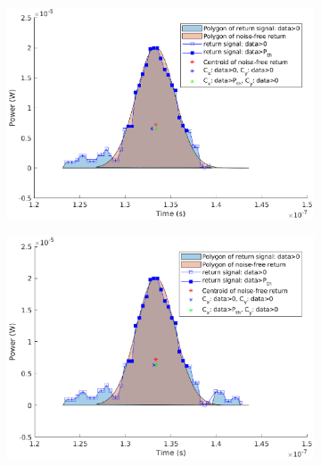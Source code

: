 \begin{figure}[t!p] %
\graphicspath{ {figures/} }
\centering
    \begin{subfigure}{.7\textwidth}
    \centering
    \includegraphics[width=.8\textwidth]{figures/chapter6_ADC/centroid_edge1_d_20_snr20_41.eps}
    \end{subfigure}%
    
    \begin{subfigure}{.7\textwidth}
    \centering
    \includegraphics[width=.8\textwidth]{figures/chapter6_ADC/centroid_edge2_d_20_snr20_41.eps}
    \end{subfigure}%
    

\end{figure}
